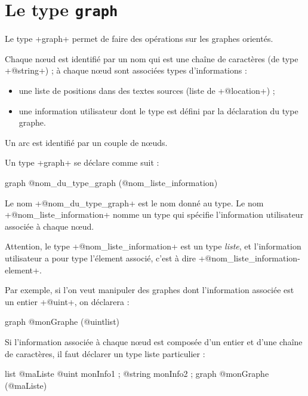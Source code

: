 
\chapter{Le type \texttt{graph}}

Le type \ggs+graph+ permet de faire des opérations sur les graphes orientés.

Chaque nœud est identifié par un nom qui est une chaîne de caractères (de type \ggs+@string+) ; à chaque nœud sont associées types d'informations :
\begin{itemize}
  \item une liste de positions dans des textes sources (liste de \ggs+@location+) ;
  \item une information utilisateur dont le type est défini par la déclaration du type graphe.
\end{itemize}

Un arc est identifié par un couple de nœuds.


Un type \ggs+graph+ se déclare comme suit :
\begin{galgascode}
graph @nom_du_type_graph (@nom_liste_information) {
}
\end{galgascode}

Le nom \ggs+@nom_du_type_graph+ est le nom donné au type. Le nom \ggs+@nom_liste_information+ nomme un type qui spécifie l'information utilisateur associée à chaque nœud.

Attention, le type \ggs+@nom_liste_information+ est un type \emph{liste}, et l'information utilisateur a pour type l'élement associé, c'est à dire \ggs+@nom_liste_information-element+. 

Par exemple, si l'on veut manipuler des graphes dont l'information associée est un entier \ggs+@uint+, on déclarera :
\begin{galgascode}
graph @monGraphe (@uintlist) {
}
\end{galgascode}

Si l'information associée à chaque nœud est composée d'un entier et d'une chaîne de caractères, il faut déclarer un type liste particulier :
\begin{galgascode}
list @maListe {
  @uint monInfo1 ;
  @string monInfo2 ;
}
graph @monGraphe (@maListe) {
}
\end{galgascode}






